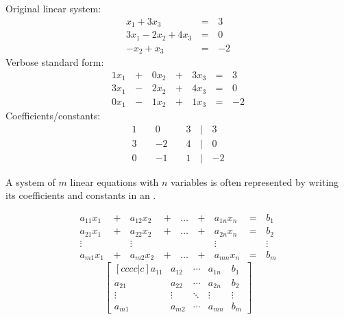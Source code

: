 \begin{applicationActivities}{1}{3}
\begin{remark}
  \begin{multicols}{3}\noindent
    Original linear system:
    \begin{alignat*}{2}
       x_1 + 3x_3 &\,=\,& 3 \\
      3x_1 - 2x_2 + 4x_3 &\,=\,& 0 \\
      -x_2 +  x_3 &\,=\,& -2
    \end{alignat*}
    Verbose standard form:
    \begin{alignat*}{4}
      1x_1 &\,+\,& 0x_2 &\,+\,& 3x_3 &\,=\,& 3 \\
      3x_1 &\,-\,& 2x_2 &\,+\,& 4x_3 &\,=\,& 0 \\
      0x_1 &\,-\,& 1x_2 &\,+\,& 1x_3 &\,=\,& -2
    \end{alignat*}
    Coefficients/constants:
    \begin{alignat*}{4}
       1 &     &  0 &\,\,& 3 &\,|\,& 3 \\
       3 &\, \,& -2 &\,\,& 4 &\,|\,& 0 \\
       0 &\, \,& -1 &\,\,& 1 &\,|\,& -2
    \end{alignat*}
  \end{multicols}
\end{remark}

\begin{definition}
  A system of \(m\) linear equations with \(n\) variables is often represented
  by writing its coefficients and constants in an .
  \begin{multicols}{2}\noindent
  \begin{alignat*}{5}
    a_{11}x_1 &\,+\,& a_{12}x_2 &\,+\,& \dots  &\,+\,& a_{1n}x_n &\,=\,& b_1 \\
    a_{21}x_1 &\,+\,& a_{22}x_2 &\,+\,& \dots  &\,+\,& a_{2n}x_n &\,=\,& b_2 \\
     \vdots&  &\vdots&   &&  &\vdots&&\vdots  \\
    a_{m1}x_1 &\,+\,& a_{m2}x_2 &\,+\,& \dots  &\,+\,& a_{mn}x_n &\,=\,& b_m
  \end{alignat*}
  \[
    \begin{bmatrix}[cccc|c]
      a_{11} & a_{12} & \cdots & a_{1n} & b_1\\
      a_{21} & a_{22} & \cdots & a_{2n} & b_2\\
      \vdots & \vdots & \ddots & \vdots & \vdots\\
      a_{m1} & a_{m2} & \cdots & a_{mn} & b_m
    \end{bmatrix}
  \]
  \end{multicols}
\end{definition}


\end{applicationActivities}
